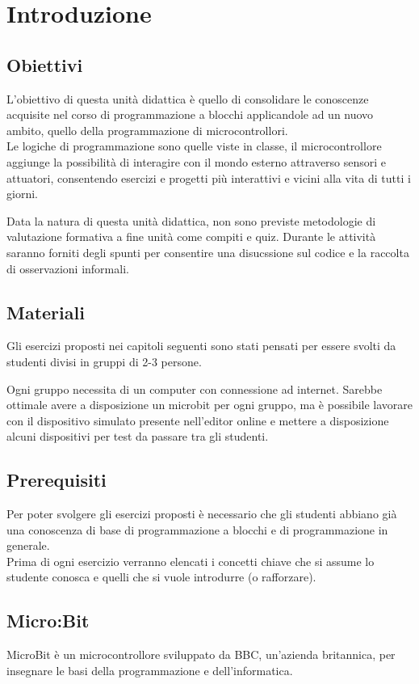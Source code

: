 \documentclass[../../docenti.tex]{subfiles}
\begin{document}
\section{Introduzione}

\subsection{Obiettivi}
L'obiettivo di questa unità didattica è quello di consolidare le conoscenze acquisite nel corso di programmazione a blocchi applicandole ad un nuovo ambito, quello della programmazione di microcontrollori.\\
Le logiche di programmazione sono quelle viste in classe, il microcontrollore aggiunge la possibilità di interagire con il mondo esterno attraverso sensori e attuatori, consentendo esercizi e progetti più interattivi e vicini alla vita di tutti i giorni. 

Data la natura di questa unità didattica, non sono previste metodologie di valutazione formativa a fine unità come compiti e quiz. Durante le attività saranno forniti degli spunti per consentire una disucssione sul codice e la raccolta di osservazioni informali.

\subsection{Materiali}
Gli esercizi proposti nei capitoli seguenti sono stati pensati per essere svolti da studenti divisi in gruppi di 2-3 persone.

Ogni gruppo necessita di un computer con connessione ad internet. Sarebbe ottimale avere a disposizione un microbit per ogni gruppo, ma è possibile lavorare con il dispositivo simulato presente nell'editor online e mettere a disposizione alcuni dispositivi per test da passare tra gli studenti.

\subsection{Prerequisiti}
Per poter svolgere gli esercizi proposti è necessario che gli studenti abbiano già una conoscenza di base di programmazione a blocchi e di programmazione in generale.\\
Prima di ogni esercizio verranno elencati i concetti chiave che si assume lo studente conosca e quelli che si vuole introdurre (o rafforzare).

\newpage
\subsection{Micro:Bit}
 MicroBit è un microcontrollore sviluppato da BBC, un'azienda britannica, per insegnare le basi della programmazione e dell'informatica.
\end{document}
